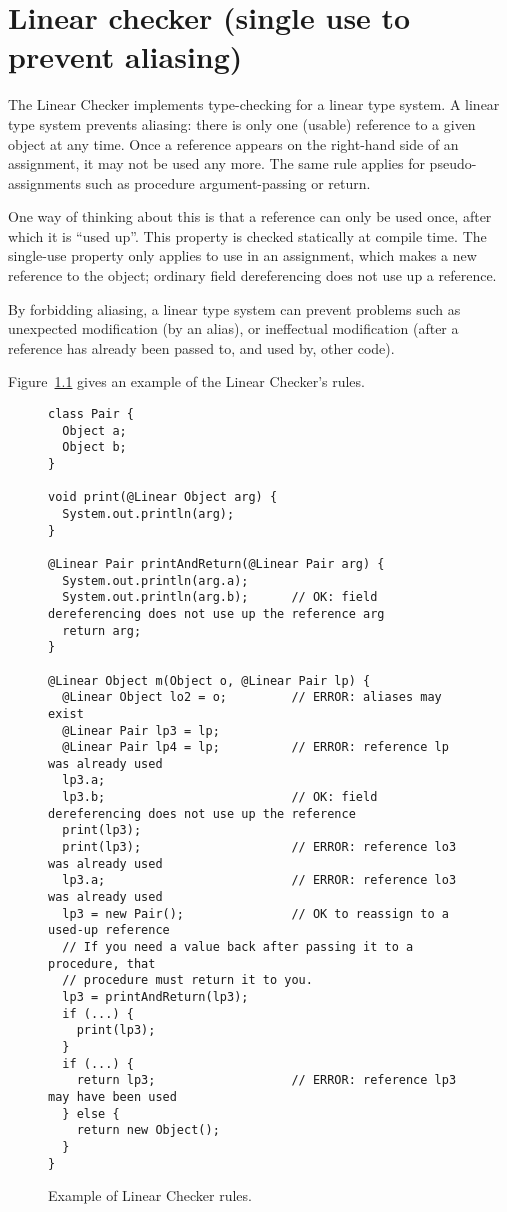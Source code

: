 \htmlhr
\chapter{Linear checker (single use to prevent aliasing)\label{linear-checker}}

The Linear Checker implements type-checking for a linear type system.  A
linear type system prevents aliasing:  there is only one (usable) reference
to a given object at any time.  Once a reference appears on the right-hand
side of an assignment, it may not be used any more.  The same rule applies
for pseudo-assignments such as procedure argument-passing or return.

One way of thinking about this is that a reference can only be used once,
after which it is ``used up''.  This property is checked statically at
compile time.  The single-use property only applies to use in an
assignment, which makes a new reference to the object; ordinary field
dereferencing does not use up a reference.

By forbidding aliasing, a linear type system can prevent problems such as
unexpected modification (by an alias), or ineffectual modification (after a
reference has already been passed to, and used by, other code).




Figure~\ref{fig:linear-example} gives an example of the Linear Checker's rules.

\begin{figure}
\smaller
\begin{Verbatim}
class Pair {
  Object a;
  Object b;
}

void print(@Linear Object arg) {
  System.out.println(arg);
}

@Linear Pair printAndReturn(@Linear Pair arg) {
  System.out.println(arg.a);
  System.out.println(arg.b);      // OK: field dereferencing does not use up the reference arg
  return arg;
}

@Linear Object m(Object o, @Linear Pair lp) {
  @Linear Object lo2 = o;         // ERROR: aliases may exist
  @Linear Pair lp3 = lp;          
  @Linear Pair lp4 = lp;          // ERROR: reference lp was already used
  lp3.a;                            
  lp3.b;                          // OK: field dereferencing does not use up the reference
  print(lp3);
  print(lp3);                     // ERROR: reference lo3 was already used
  lp3.a;                          // ERROR: reference lo3 was already used
  lp3 = new Pair();               // OK to reassign to a used-up reference
  // If you need a value back after passing it to a procedure, that
  // procedure must return it to you.
  lp3 = printAndReturn(lp3);
  if (...) {
    print(lp3);
  }
  if (...) {
    return lp3;                   // ERROR: reference lp3 may have been used
  } else {
    return new Object();
  }
}
\end{Verbatim}
\caption{Example of Linear Checker rules.}
\label{fig:linear-example}
\end{figure}


